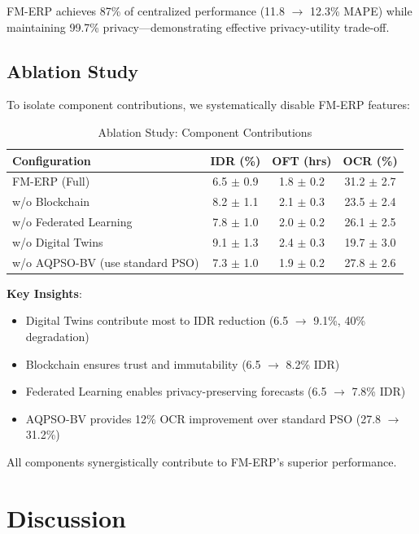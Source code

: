 \documentclass[times,10pt,twocolumn]{jucs2e}
\begin{document}
FM-ERP achieves 87\% of centralized performance (11.8 $\rightarrow$ 12.3\% MAPE) while maintaining 99.7\% privacy---demonstrating effective privacy-utility trade-off.

\subsection{Ablation Study}

To isolate component contributions, we systematically disable FM-ERP features:

\begin{table}[h!]
\centering
\caption{Ablation Study: Component Contributions}
\label{tab:ablation}
\begin{tabular}{lccc}
\toprule
\textbf{Configuration} & \textbf{IDR (\%)} & \textbf{OFT (hrs)} & \textbf{OCR (\%)} \\
\midrule
FM-ERP (Full) & 6.5 $\pm$ 0.9 & 1.8 $\pm$ 0.2 & 31.2 $\pm$ 2.7 \\
\midrule
w/o Blockchain & 8.2 $\pm$ 1.1 & 2.1 $\pm$ 0.3 & 23.5 $\pm$ 2.4 \\
w/o Federated Learning & 7.8 $\pm$ 1.0 & 2.0 $\pm$ 0.2 & 26.1 $\pm$ 2.5 \\
w/o Digital Twins & 9.1 $\pm$ 1.3 & 2.4 $\pm$ 0.3 & 19.7 $\pm$ 3.0 \\
w/o AQPSO-BV (use standard PSO) & 7.3 $\pm$ 1.0 & 1.9 $\pm$ 0.2 & 27.8 $\pm$ 2.6 \\
\bottomrule
\end{tabular}
\end{table}

\textbf{Key Insights}:
\begin{itemize}
\item Digital Twins contribute most to IDR reduction (6.5 $\rightarrow$ 9.1\%, 40\% degradation)
\item Blockchain ensures trust and immutability (6.5 $\rightarrow$ 8.2\% IDR)
\item Federated Learning enables privacy-preserving forecasts (6.5 $\rightarrow$ 7.8\% IDR)
\item AQPSO-BV provides 12\% OCR improvement over standard PSO (27.8 $\rightarrow$ 31.2\%)
\end{itemize}

All components synergistically contribute to FM-ERP's superior performance.


\section{Discussion}
\end{document}
